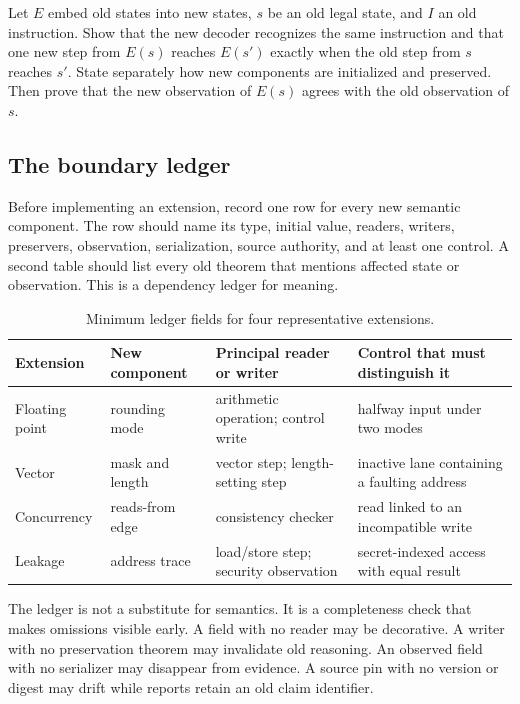 \begin{proofkit}[title={Template for a conservative extension}]
Let \(E\) embed old states into new states, \(s\) be an old legal state, and
\(I\) an old instruction. Show that the new decoder recognizes the same
instruction and that one new step from \(E(s)\) reaches \(E(s')\) exactly when
the old step from \(s\) reaches \(s'\). State separately how new components are
initialized and preserved. Then prove that the new observation of \(E(s)\)
agrees with the old observation of \(s\).
\end{proofkit}

\subsection{The boundary ledger}

Before implementing an extension, record one row for every new semantic
component. The row should name its type, initial value, readers, writers,
preservers, observation, serialization, source authority, and at least one
control. A second table should list every old theorem that mentions affected
state or observation. This is a dependency ledger for meaning.

\begin{table}[htbp]
\centering
\caption{Minimum ledger fields for four representative extensions.}
\begin{tabular}{@{}p{}p{}p{}p{}@{}}
\toprule
Extension & New component & Principal reader or writer & Control that must distinguish it \\
\midrule
Floating point & rounding mode & arithmetic operation; control write & halfway input under two modes \\
Vector & mask and length & vector step; length-setting step & inactive lane containing a faulting address \\
Concurrency & reads-from edge & consistency checker & read linked to an incompatible write \\
Leakage & address trace & load/store step; security observation & secret-indexed access with equal result \\
\bottomrule
\end{tabular}
\end{table}

The ledger is not a substitute for semantics. It is a completeness check that
makes omissions visible early. A field with no reader may be decorative. A
writer with no preservation theorem may invalidate old reasoning. An observed
field with no serializer may disappear from evidence. A source pin with no
version or digest may drift while reports retain an old claim identifier.

